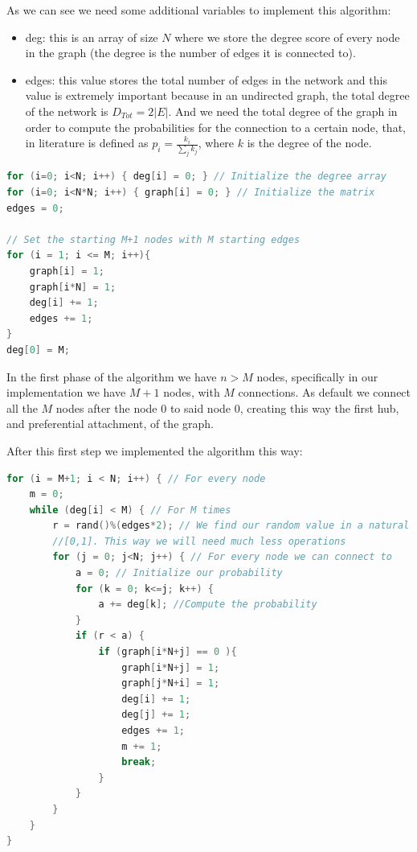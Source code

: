 \documentclass[titlepage]{article}
\begin{document}
As we can see we need some additional variables to implement this algorithm:
\begin{itemize}
    \item deg: this is an array of size $N$ where we store the degree score of every node in the graph (the degree is the number of edges it is connected to).
    \item edges: this value stores the total number of edges in the network and this value is extremely important because in an undirected graph, the total degree of the network is $D_{Tot}=2|E|$. And we need the total degree of the graph in order to compute the probabilities  for the connection to a certain node, that, in literature is defined as $p_i=\frac{k_i}{\sum_j k_j}$, where $k$ is the degree of the node.
\end{itemize}

\begin{minipage}{\linewidth}
\begin{lstlisting}[language=C, style=customc, breaklines=true]
for (i=0; i<N; i++) { deg[i] = 0; } // Initialize the degree array
for (i=0; i<N*N; i++) { graph[i] = 0; } // Initialize the matrix
edges = 0;
        
// Set the starting M+1 nodes with M starting edges
for (i = 1; i <= M; i++){
    graph[i] = 1;
    graph[i*N] = 1;
    deg[i] += 1;
    edges += 1;
}
deg[0] = M;
\end{lstlisting}
\end{minipage}

In the first phase of the algorithm we have $n>M$ nodes, specifically in our implementation we have $M+1$ nodes, with $M$ connections. As default we connect all the $M$ nodes after the node $0$ to said node $0$, creating this way the first hub, and preferential attachment, of the graph.

After this first step we implemented the algorithm this way:

\begin{minipage}{\linewidth}
\begin{lstlisting}[language=C, style=customc, breaklines=true]
for (i = M+1; i < N; i++) { // For every node
    m = 0;
    while (deg[i] < M) { // For M times
        r = rand()%(edges*2); // We find our random value in a natural range of numbers instead of
        //[0,1]. This way we will need much less operations
        for (j = 0; j<N; j++) { // For every node we can connect to
            a = 0; // Initialize our probability
            for (k = 0; k<=j; k++) {
                a += deg[k]; //Compute the probability
            }
            if (r < a) {
                if (graph[i*N+j] == 0 ){
                    graph[i*N+j] = 1;
                    graph[j*N+i] = 1;
                    deg[i] += 1;
                    deg[j] += 1;
                    edges += 1;
                    m += 1;
                    break;
                }
            }
        }
    }
}
\end{lstlisting}
\end{minipage}
\end{document}
